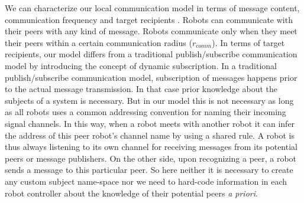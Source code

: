 \documentclass[journal]{IEEEtran}
\begin{document}
We can characterize our local communication model in terms of message content, communication frequency and target recipients \cite{Gerkey+2001}. Robots can communicate with their peers with any kind of message. Robots communicate only when they meet their peers within a certain communication radius ($r_{comm}$). In terms of target recipients, our model differs from a traditional publish/subscribe communication model by introducing the concept of dynamic subscription. In a traditional publish/subscribe communication model, subscription of messages happens prior to the actual message transmission. In that case prior knowledge about the subjects of a system is necessary. But in our model this is not necessary as long as all robots uses a common addressing convention for naming their incoming signal channels. In this way, when a robot meets with another robot it can infer the address of this peer robot's channel name by using a shared rule. A robot is thus always listening to its own channel for receiving messages from its potential peers or message publishers. On the other side, upon recognizing a peer, a robot sends a message to this particular peer. So here neither it is necessary to create any custom subject name-space  \cite{Gerkey+2001} nor we need to hard-code information in each robot controller about the knowledge of their potential peers {\em a priori}. %
%
\end{document}
